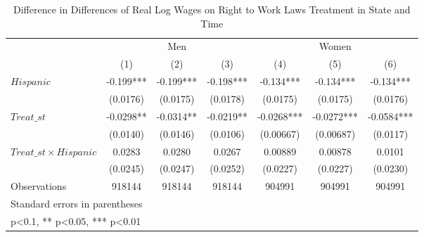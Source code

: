 \begin{table}[htbp]\centering
\def\sym#1{\ifmmode^{#1}\else\(^{#1}\)\fi}
\caption{Difference in Differences of Real Log Wages on Right to Work Laws Treatment in State and Time}
\begin{tabular}{l*{6}{c}}
\hline\hline
                    &\multicolumn{3}{c}{Men}                        &\multicolumn{3}{c}{Women}                      \\\cmidrule(lr){2-4}\cmidrule(lr){5-7}
                    &\multicolumn{1}{c}{(1)}   &\multicolumn{1}{c}{(2)}   &\multicolumn{1}{c}{(3)}   &\multicolumn{1}{c}{(4)}   &\multicolumn{1}{c}{(5)}   &\multicolumn{1}{c}{(6)}   \\
\hline
$ Hispanic $        &      -0.199***&      -0.199***&      -0.198***&      -0.134***&      -0.134***&      -0.134***\\
                    &    (0.0176)   &    (0.0175)   &    (0.0178)   &    (0.0175)   &    (0.0175)   &    (0.0176)   \\
[1em]
$ Treat\_{st} $      &     -0.0298** &     -0.0314** &     -0.0219** &     -0.0268***&     -0.0272***&     -0.0584***\\
                    &    (0.0140)   &    (0.0146)   &    (0.0106)   &   (0.00667)   &   (0.00687)   &    (0.0117)   \\
[1em]
$ Treat\_{st} \times Hispanic $&      0.0283   &      0.0280   &      0.0267   &     0.00889   &     0.00878   &      0.0101   \\
                    &    (0.0245)   &    (0.0247)   &    (0.0252)   &    (0.0227)   &    (0.0227)   &    (0.0230)   \\
\hline
Observations        &      918144   &      918144   &      918144   &      904991   &      904991   &      904991   \\
\hline\hline
\multicolumn{7}{l}{\footnotesize Standard errors in parentheses}\\
\multicolumn{7}{l}{\footnotesize * p<0.1, ** p<0.05, *** p<0.01}\\
\end{tabular}
\end{table}
